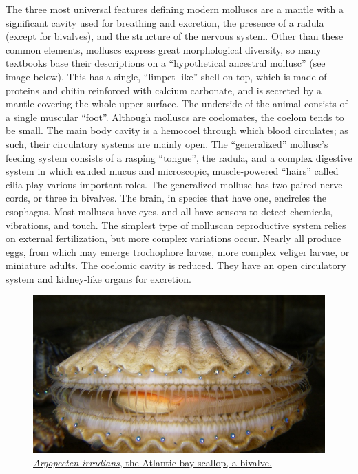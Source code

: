 The three most universal features defining modern molluscs are a mantle with a significant cavity used for breathing and excretion, the presence of a radula (except for bivalves), and the structure of the nervous system. Other than these common elements, molluscs express great morphological diversity, so many textbooks base their descriptions on a ``hypothetical ancestral mollusc'' (see image below). This has a single, ``limpet-like'' shell on top, which is made of proteins and chitin reinforced with calcium carbonate, and is secreted by a mantle covering the whole upper surface. The underside of the animal consists of a single muscular ``foot''. Although molluscs are coelomates, the coelom tends to be small. The main body cavity is a hemocoel through which blood circulates; as such, their circulatory systems are mainly open. The ``generalized'' mollusc's feeding system consists of a rasping ``tongue'', the radula, and a complex digestive system in which exuded mucus and microscopic, muscle-powered ``hairs'' called cilia play various important roles. The generalized mollusc has two paired nerve cords, or three in bivalves. The brain, in species that have one, encircles the esophagus. Most molluscs have eyes, and all have sensors to detect chemicals, vibrations, and touch. The simplest type of molluscan reproductive system relies on external fertilization, but more complex variations occur. Nearly all produce eggs, from which may emerge trochophore larvae, more complex veliger larvae, or miniature adults. The coelomic cavity is reduced. They have an open circulatory system and kidney-like organs for excretion.



\begin{figure}

{\centering \includegraphics[width=0.7\linewidth]{./figures/animals/Argopecten_irradians} 

}

\caption{\href{https://commons.wikimedia.org/wiki/File:Argopecten_irradians.jpg}{\emph{Argopecten irradians}, the Atlantic bay scallop, a bivalve.}}\label{fig:bivalve}
\end{figure}

